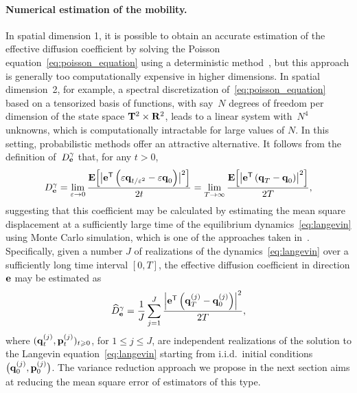 \documentclass[11pt,a4paper]{article}
\begin{document}
\paragraph{Numerical estimation of the mobility.}
In spatial dimension 1,
it is possible to obtain an accurate estimation of the effective diffusion coefficient by solving the Poisson equation~\eqref{eq:poisson_equation} using a deterministic method~\cite{roussel2018spectral},
but this approach is generally too computationally expensive in higher dimensions.
In spatial dimension~2, for example,
a spectral discretization of~\eqref{eq:poisson_equation} based on a tensorized basis of functions,
with say~$N$ degrees of freedom per dimension of the state space $\mathbf T^2 \times \mathbf R^2$, leads to a linear system with~$N^4$ unknowns,
which is computationally intractable for large values of $N$.
In this setting, probabilistic methods offer an attractive alternative.
It follows from the definition of~$D^{\gamma}_{\boldsymbol{\mathbf e}}$ that,
for any $t > 0$,%
\begin{equation}
    \label{eq:einsteins_formula}
    D^{\gamma}_{\boldsymbol{\mathbf e}}
    =\lim_{\varepsilon \to 0} \frac{\mathbf{E}\Bigl[\bigl\lvert \boldsymbol{\mathbf e}^\mathsf T \left(\varepsilon \boldsymbol{\mathbf q}_{t/\varepsilon^2} - \varepsilon \boldsymbol{\mathbf q}_0\right) \bigr\rvert^2\Bigr]}{2 t}
    =\lim_{T \to \infty} \frac{\mathbf{E} \Bigl[\bigl\lvert \boldsymbol{\mathbf e}^\mathsf T \left(\boldsymbol{\mathbf q}_T - \boldsymbol{\mathbf q}_0\right) \bigr\rvert^2\Bigr]}{2T},
\end{equation}
suggesting that this coefficient may be calculated by
estimating the mean square displacement at a sufficiently large time of the equilibrium dynamics~\eqref{eq:langevin}
using Monte Carlo simulation,
which is one of the approaches taken in~\cite{MR2427108}.
Specifically, given a number $J$ of realizations of the dynamics~\eqref{eq:langevin} over a sufficiently long time interval $[0, T]$,
the effective diffusion coefficient in direction $\boldsymbol{\mathbf e}$ may be estimated as
\begin{equation}
    \label{eq:naive_estimator}
    \widehat D^{\gamma}_{\boldsymbol{\mathbf e}}
    = \frac{1}{J} \sum_{j=1}^{J} \frac{\left\lvert \boldsymbol{\mathbf e}^\mathsf T \left(\boldsymbol{\mathbf q}^{(j)}_T - \boldsymbol{\mathbf q}^{(j)}_0\right) \right\rvert^2}{2T},
\end{equation}
where $(\boldsymbol{\mathbf q}_t^{(j)}, \boldsymbol{\mathbf p}_t^{(j)})_{t \geqslant 0}$, for $1 \leq j \leq J$,
are independent realizations of the solution to the Langevin equation~\eqref{eq:langevin} starting from i.i.d.\ initial conditions $\bigl(\boldsymbol{\mathbf q}^{(j)}_0, \boldsymbol{\mathbf p}^{(j)}_0\bigr)$.
The variance reduction approach we propose in the next section aims at reducing the mean square error of estimators of this type.
\end{document}
